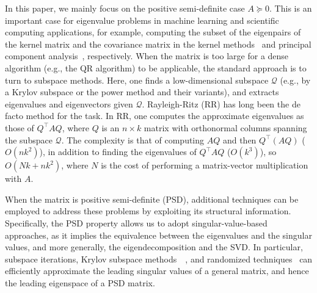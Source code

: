 \documentclass[onefignum,onetabnum]{siamart251216}
\def\subspace{\mathcal{Q}}
\begin{document}
In this paper, we mainly focus on the positive semi-definite case $A\succeq 0$. This is an important case for eigenvalue problems in machine learning and scientific computing applications, for example, computing the subset of the eigenpairs of the kernel matrix and the covariance matrix in the kernel methods~\cite{abedsoltan2023toward, fowlkes2004spectral, meanti2020kernel, rudi2017falkon} and principal component analysis~\cite{bishop2006pattern}, respectively. When the matrix is too large for a dense algorithm (e.g., the QR algorithm) to be applicable, the standard approach is to turn to subspace methods. Here, one finds a low-dimensional subspace $\subspace$ (e.g., by a Krylov subspace or the power method and their variants), and extracts eigenvalues and eigenvectors given $\subspace$. Rayleigh-Ritz (RR) has long been the de facto method for the task. In RR, one computes the approximate eigenvalues as those of $Q^\top AQ$, where $Q$ is an $n\times k$ matrix with orthonormal columns spanning the subspace $\subspace$. The complexity is that of computing $AQ$ and then $Q^\top(AQ)$ ($O(nk^2)$), in addition to finding the eigenvalues of $Q^\top AQ$ ($O(k^3)$), so $O(Nk+nk^2)$, where $N$ is the cost of performing a matrix-vector multiplication with $A$. 

When the matrix is positive semi-definite (PSD), additional techniques can be employed to address these problems by exploiting its structural information. Specifically, the PSD property allows us to adopt singular-value-based approaches, as it implies the equivalence between the eigenvalues and the singular values, and more generally, the eigendecomposition and the SVD. In particular, subspace iterations, Krylov subspace methods~\cite[Sec.~12,~14]{parlett1998symmetric}~\cite[Sec.~5,~6]{saad2011numerical}, and randomized techniques~\cite{halko2011finding, martinsson2020randomized} can efficiently approximate the leading singular values of a general matrix, and hence the leading eigenspace of a PSD matrix. 
\end{document}
